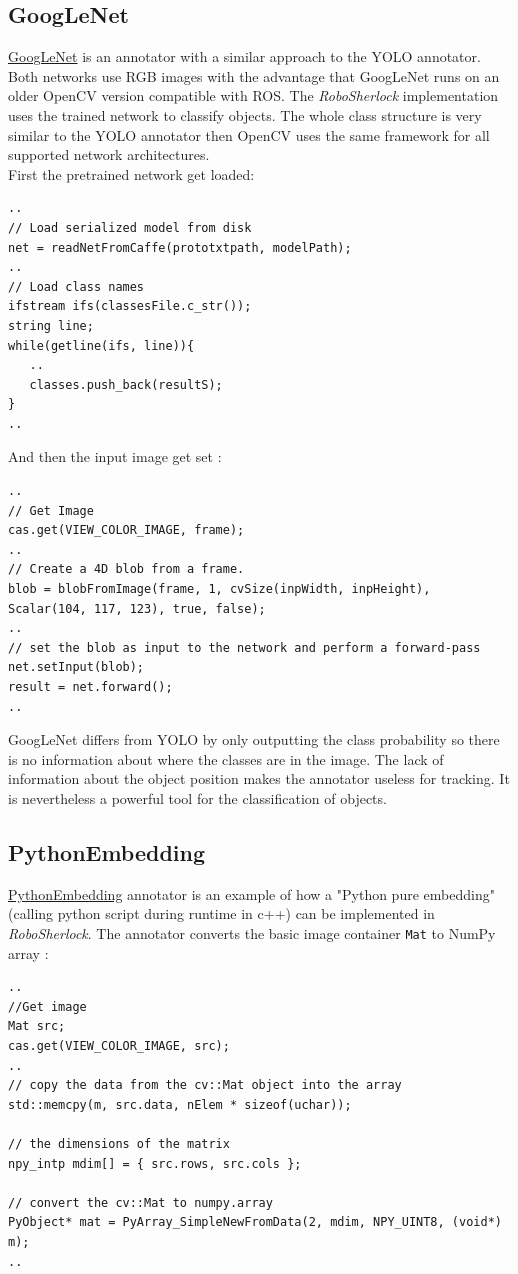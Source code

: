 \documentclass[main.tex]{subfiles}
\begin{document}
				\subsection{GoogLeNet}
\href{https://github.com/SUTURO/suturo_perception/blob/Handcamera_tracking/rs_Athene/src/GoogLeNet.cpp}{GoogLeNet} is an annotator with a similar approach to the YOLO annotator. Both networks use RGB images with the advantage that GoogLeNet runs on an older OpenCV version compatible with ROS.
The \textit{RoboSherlock} implementation uses the trained network to classify objects. The whole class structure is very similar to the YOLO annotator then OpenCV uses the same framework for all supported network architectures. \\
First the pretrained network get loaded: 
\begin{lstlisting}
.. 
// Load serialized model from disk
net = readNetFromCaffe(prototxtpath, modelPath);
..
// Load class names 
ifstream ifs(classesFile.c_str());
string line;
while(getline(ifs, line)){
   ..
   classes.push_back(resultS);
}
..
\end{lstlisting}
And then the input image get set : 
\begin{lstlisting}
..
// Get Image 
cas.get(VIEW_COLOR_IMAGE, frame);
..
// Create a 4D blob from a frame.
blob = blobFromImage(frame, 1, cvSize(inpWidth, inpHeight), Scalar(104, 117, 123), true, false);
..
// set the blob as input to the network and perform a forward-pass
net.setInput(blob);
result = net.forward();
..
\end{lstlisting}
GoogLeNet differs from YOLO by only outputting the class probability so there is no information about where the classes are in the image. The lack of information about the object position makes the annotator useless for tracking. It is nevertheless a powerful tool for the classification of objects. 

				\subsection{PythonEmbedding}
\href{https://github.com/SUTURO/suturo_perception/blob/Handcamera_tracking/rs_Athene/src/PythonEmbedding.cpp}{PythonEmbedding} annotator is an example of how a "Python pure embedding" (calling python script during runtime in c++) can be implemented in \textit{RoboSherlock}. The annotator converts the basic image container \texttt{Mat} to NumPy array : 
\begin{lstlisting}
..
//Get image
Mat src;
cas.get(VIEW_COLOR_IMAGE, src);
..
// copy the data from the cv::Mat object into the array
std::memcpy(m, src.data, nElem * sizeof(uchar));

// the dimensions of the matrix
npy_intp mdim[] = { src.rows, src.cols };
    
// convert the cv::Mat to numpy.array
PyObject* mat = PyArray_SimpleNewFromData(2, mdim, NPY_UINT8, (void*) m);
..
\end{lstlisting}
\end{document}
